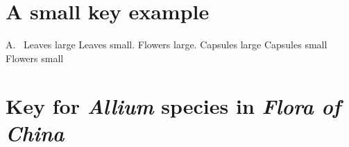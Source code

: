 \documentclass{ctexart}
\begin{document}
\section*{A small key example}

\begin{Key*}{A.~} %
\alter Leaves large 
\alter Leaves small.
	\alter Flowers large.
		\alter Capsules large 
		\alter Capsules small 
	\alter Flowers small 
\end{Key*}

\section*{Key for \textit{Allium} species in \emph{Flora of China}}
\end{document}
